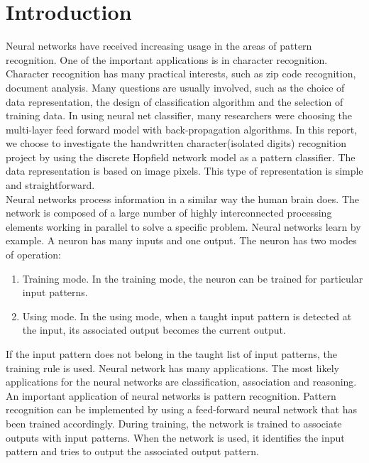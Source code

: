 \section{Introduction}
Neural networks have received increasing usage in the areas of pattern recognition. One of the important applications is in character recognition. Character recognition has many practical interests, such as zip code recognition, document analysis. Many questions are usually involved, such as the choice of data representation, the design of classification algorithm and the selection of training data. In using neural net classifier, many researchers were choosing the multi-layer feed forward model with back-propagation algorithms. In this report, we choose to investigate the handwritten character(isolated digits) recognition project by using the discrete Hopfield network model as a pattern classifier. The data representation is based on image pixels. This type of representation is simple and straightforward. \\

Neural networks process information in a similar way the human brain does. The network is composed of a large number of highly interconnected processing elements working in parallel to solve a specific problem. Neural networks learn by example. A neuron has many inputs and one output. The neuron has two modes of operation:
\begin{enumerate}[label=(\alph*)]
\item Training mode. In the training mode, the neuron can be trained for particular input patterns.
\item Using mode. In the using mode, when a taught input pattern is detected at the input, its associated output becomes the current output.
\end{enumerate} 
If the input pattern does not belong in the taught list of input patterns, the training rule is used. Neural network has many applications. The most likely applications for the neural networks are classification, association and reasoning. An important application of neural networks is pattern recognition. Pattern recognition can be implemented by using a feed-forward neural network that has been trained accordingly. During training, the network is trained to associate outputs with input patterns. When the network is used, it identifies the input pattern and tries to output the associated output pattern.